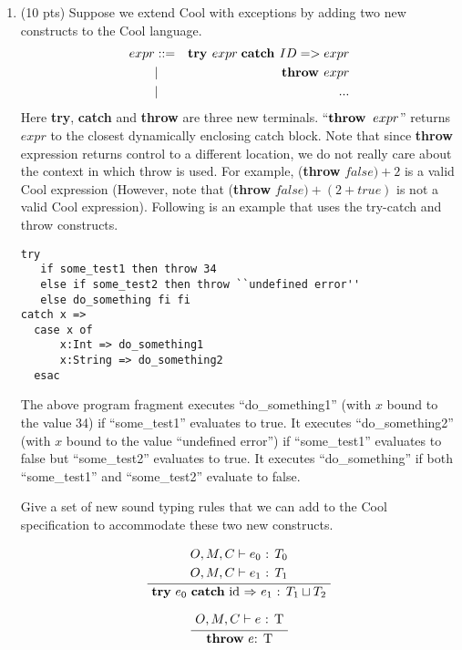 \documentclass[10pt]{article}
\newcommand{\infertext}[2]{\infer{{\textrm{#2}}}{\begin{aligned}#1\end{aligned}}}
\begin{document}
\begin{enumerate}
\medskip
\item  (10 pts) Suppose we extend Cool with exceptions by adding two new constructs
to the Cool language.
\begin{eqnarray*}
  expr & ::= & \textit{\bf try } expr \;\textit{\bf catch } ID => expr \\
	   & |   & \textit{\bf throw } expr \\
	   & | & ...
\end{eqnarray*}
Here {\bf try}, {\bf catch} and {\bf throw} are three new terminals.
  ``${\bf throw }\;\; expr$'' returns $expr$ to the
  closest dynamically enclosing catch block.
Note that since {\bf throw} expression returns control to a different location, we do not really
  care about the context in which throw is used. For example,
({\bf throw} $false) + 2$ is a valid Cool expression (However, note that
  ({\bf throw} $false) + (2+true)$ is not a valid Cool expression).  Following is an example that uses the
try-catch and throw constructs.
\begin{verbatim}
try
   if some_test1 then throw 34
   else if some_test2 then throw ``undefined error''
   else do_something fi fi
catch x =>
  case x of
	  x:Int => do_something1
	  x:String => do_something2
  esac
\end{verbatim}

The above program fragment executes
  ``do\_something1'' (with $x$ bound to the value 34) if ``some\_test1''
  evaluates to \textsf{true}. It executes ``do\_something2'' (with $x$ bound to the
  value ``undefined error'') if ``some\_test1'' evaluates to \textsf{false} but
  ``some\_test2'' evaluates to \textsf{true}. It executes ``do\_something'' if both
  ``some\_test1'' and ``some\_test2'' evaluate to \textsf{false}.


Give a set of new sound typing rules that we can add to the Cool specification
to accommodate these two new constructs.

\begin{equation} \infertext{
	& \textrm{ $O, M, C \vdash e_0$ : $T_0$ } \\
	& \textrm{ $O, M, C \vdash e_1$ : $T_1$ } \\
} {
	\textbf{try} $e_0$ \textbf{catch} id \textbf{$\Rightarrow$} $e_1$ : $T_1 \sqcup T_2$
}\end{equation}

\begin{equation} \infertext{
	\textrm{ $O, M, C \vdash e$ : T }	
} {
	\textbf{throw} $e$: T
}\end{equation}


\end{enumerate}
\end{document}
